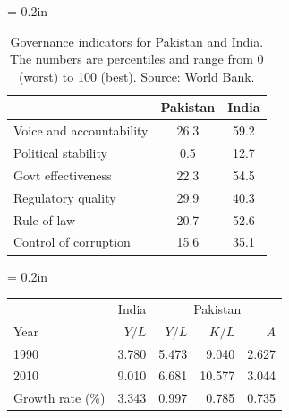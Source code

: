 \documentclass[letterpaper,12pt]{exam}
\begin{document}
\begin{questions}
\begin{table}[t]
    \centering
    \tabcolsep = 0.2in
    \begin{tabular}{lcc}
    \toprule
    & {Pakistan} & India \\
    \midrule
    Voice and accountability	& 26.3 & 59.2  \\
    Political stability	        & 0.5  & 12.7 \\
    Govt effectiveness	        & 22.3 & 54.5 \\
    Regulatory quality	        & 29.9 & 40.3 \\
    Rule of law		            & 20.7 & 52.6 \\
    Control of corruption	    & 15.6 & 35.1 \\
    \bottomrule
    \end{tabular}
    \caption{Governance indicators for Pakistan and India.
    The numbers are percentiles and range from 0 (worst) to 100 (best).
    Source:  World Bank.}
    \label{tab:pakistan-governance}
\end{table}



\begin{solution}
\begin{center}
    \tabcolsep = 0.2in
    \begin{tabular}{lrrrr}
    \toprule
    & India & \multicolumn{3}{c}{Pakistan}  \\
    \cmidrule(r){2-2} \cmidrule{3-5}
    Year     &  $Y/L$ &  $ Y/L $   &  $K/L$  & $A$  \\
    \midrule
    1990 &  3.780   &   5.473  &   9.040   & 2.627 \\
    2010 &  9.010   &   6.681  &   10.577  & 3.044 \\
    Growth rate (\%) & 3.343  & 0.997 & 0.785 & 0.735 \\
    \bottomrule
    \end{tabular}
\end{center}


\end{solution}
\end{questions}
\end{document}
